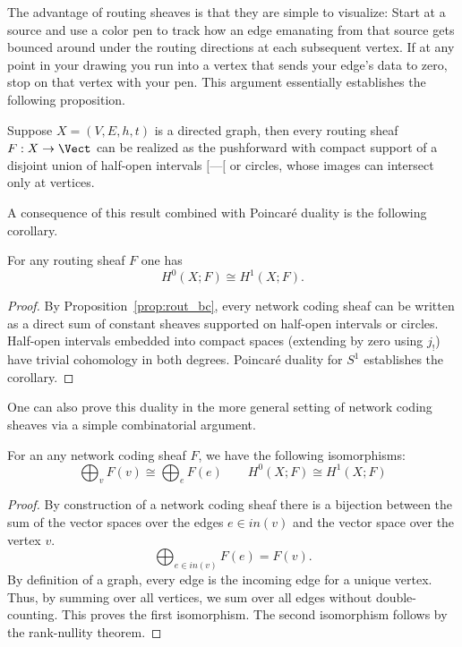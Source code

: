 The advantage of routing sheaves is that they are simple to visualize: Start at a source and use a color pen to track how an edge emanating from that source gets bounced around under the routing directions at each subsequent vertex. If at any point in your drawing you run into a vertex that sends your edge's data to zero, stop on that vertex with your pen. This argument essentially establishes the following proposition. 

\begin{prop}\label{prop:rout_bc}
	Suppose $X=(V,E,h,t)$ is a directed graph, then every routing sheaf $F:X\to\Vect$ can be realized as the pushforward with compact support of a disjoint union of half-open intervals $[\textrm{---}[$ or circles, whose images can intersect only at vertices.
\end{prop}

A consequence of this result combined with Poincar\'e duality is the following corollary.

\begin{cor}[Duality]
	For any routing sheaf $F$ one has
	\[
		H^0(X;F)\cong H^1(X;F).
	\]
\end{cor}
\begin{proof}
	By Proposition~\ref{prop:rout_bc}, every network coding sheaf can be written as a direct sum of constant sheaves supported on half-open intervals or circles. Half-open intervals embedded into compact spaces (extending by zero using $j_!$) have trivial cohomology in both degrees. Poincar\'e duality for $S^1$ establishes the corollary.
\end{proof}

One can also prove this duality in the more general setting of network coding sheaves via a simple combinatorial argument.

\begin{prop}
	For an any network coding sheaf $F$, we have the following isomorphisms:
	\[
		\bigoplus_v F(v) \cong \bigoplus_e F(e) \qquad  H^0(X;F)\cong H^1(X;F)
	\]
\end{prop}
\begin{proof}
	By construction of a network coding sheaf there is a bijection between the sum of the vector spaces over the edges $e\in in(v)$ and the vector space over the vertex $v$.
	\[
		\bigoplus_{e\in in(v)} F(e) = F(v).
	\]
	By definition of a graph, every edge is the incoming edge for a unique vertex. Thus, by summing over all vertices, we sum over all edges without double-counting. This proves the first isomorphism. The second isomorphism follows by the rank-nullity theorem.  
\end{proof}

